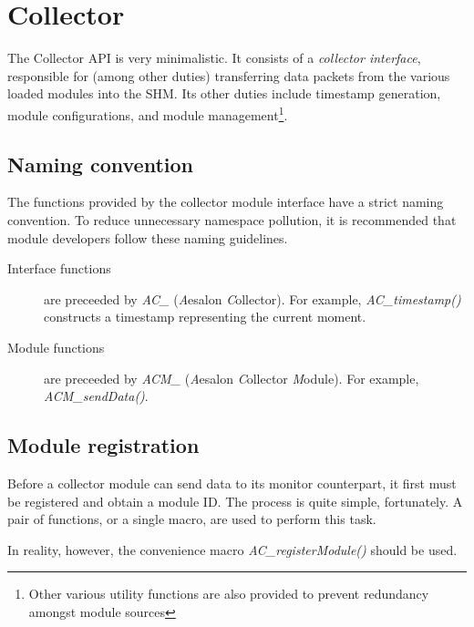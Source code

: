 \documentclass[a4paper,10pt]{report}
\begin{document}
\section{Collector}
The Collector API is very minimalistic. It consists of a \emph{collector interface}, responsible for (among other duties)
transferring data packets from the various loaded modules into the SHM. Its other duties include timestamp generation,
module configurations, and module management\footnote{Other various utility functions are also provided to prevent
redundancy amongst module sources}.

\subsection{Naming convention}
The functions provided by the collector module interface have a strict naming convention. To reduce unnecessary namespace
pollution, it is recommended that module developers follow these naming guidelines.
\begin{description}
 \item[Interface functions] are preceeded by \emph{AC\_} (\emph{A}esalon \emph{C}ollector). For example, \emph{AC\_timestamp()}
constructs a timestamp representing the current moment.
 \item[Module functions] are preceeded by \emph{ACM\_} (\emph{A}esalon \emph{C}ollector \emph{M}odule). For example,
\emph{ACM\_sendData()}.
\end{description}

\subsection{Module registration}
Before a collector module can send data to its monitor counterpart, it first must be registered and obtain a module ID.
The process is quite simple, fortunately. A pair of functions, or a single macro, are used to perform this task.



In reality, however, the convenience macro \emph{AC\_registerModule()} should be used.
\end{document}
